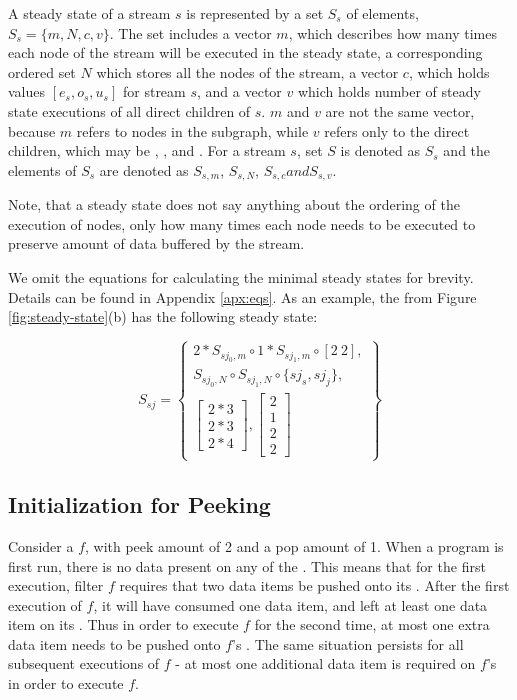 A steady state of a stream $s$ is represented by a set $S_s$ of
elements, $S_s = \{m, N, c, v\}$. The set includes a vector $m$,
which describes how many times each {\StreamIt} node of the stream
will be executed in the steady state, a corresponding ordered set
$N$ which stores all the nodes of the stream, a vector $c$, which
holds values $[e_s, o_s, u_s]$ for stream $s$, and a vector $v$
which holds number of steady state executions of all direct
children of $s$. $m$ and $v$ are not the same vector, because $m$
refers to nodes in the subgraph, while $v$ refers only to the
direct children, which may be {\filters}, {\pipelines},
{\splitters} and {\feedbackloops}. For a stream $s$, set $S$ is
denoted as $S_s$ and the elements of $S_s$ are denoted as
$S_{s,m}$, $S_{s,N}$, $S_{s,c} and S_{s,v}$.

Note, that a steady state does not say anything about the ordering
of the execution of nodes, only how many times each node needs to
be executed to preserve amount of data buffered by the stream.

We omit the equations for calculating the minimal steady states
for brevity. Details can be found in Appendix \ref{apx:eqs}. As an
example, the \splitjoin from Figure \ref{fig:steady-state}(b) has
the following steady state:

\begin{displaymath}
S_{sj} = \left\{
\begin{array}{c}
2 * S_{sj_0, m} \circ 1 * S_{sj_1, m} \circ [2\ 2], \\
S_{sj_0, N} \circ S_{sj_1, N} \circ \{sj_s, sj_j\}, \\
\left[
\begin{array}{c}
2 * 3 \\ 2 * 3 \\ 2 * 4
\end{array}
\right], \left[
\begin{array}{c}
2 \\ 1 \\ 2 \\ 2
\end{array}\right]
\end{array} \right\}
\end{displaymath}

\subsection{Initialization for Peeking}
\label{sec:init-peeking}

Consider a {\filter} $f$, with peek amount of 2 and a pop amount of
1.  When a {\StreamIt} program is first run, there is no data
present on any of the {{\Channels}}.  This means that for the first
execution, filter $f$ requires that two data items be pushed onto
its {\Input} {{\Channel}}.  After the first execution of $f$, it will
have consumed one data item, and left at least one data item on
its {\Input} {{\Channel}}.  Thus in order to execute $f$ for the second
time, at most one extra data item needs to be pushed onto $f$'s
{\Input} {{\Channel}}.  The same situation persists for all subsequent
executions of $f$ - at most one additional data item is required
on $f$'s {\Input} {{\Channel}} in order to execute $f$.

